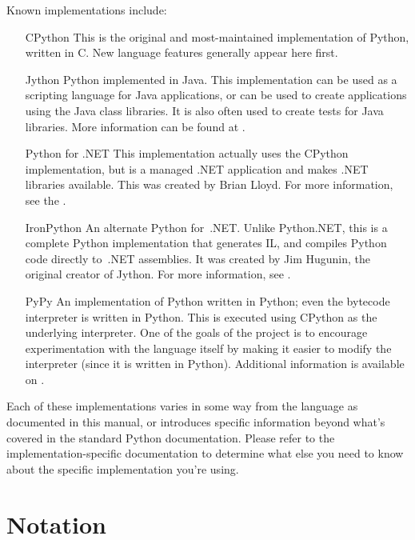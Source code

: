 Known implementations include:

\begin{itemize}
\item[CPython]
This is the original and most-maintained implementation of Python,
written in C.  New language features generally appear here first.

\item[Jython]
Python implemented in Java.  This implementation can be used as a
scripting language for Java applications, or can be used to create
applications using the Java class libraries.  It is also often used to
create tests for Java libraries.  More information can be found at
.

\item[Python for .NET]
This implementation actually uses the CPython implementation, but is a
managed .NET application and makes .NET libraries available.  This was
created by Brian Lloyd.  For more information, see the .

\item[IronPython]
An alternate Python for\ .NET.  Unlike Python.NET, this is a complete
Python implementation that generates IL, and compiles Python code
directly to\ .NET assemblies.  It was created by Jim Hugunin, the
original creator of Jython.  For more information, see .

\item[PyPy]
An implementation of Python written in Python; even the bytecode
interpreter is written in Python.  This is executed using CPython as
the underlying interpreter.  One of the goals of the project is to
encourage experimentation with the language itself by making it easier
to modify the interpreter (since it is written in Python).  Additional
information is available on .
\end{itemize}

Each of these implementations varies in some way from the language as
documented in this manual, or introduces specific information beyond
what's covered in the standard Python documentation.  Please refer to
the implementation-specific documentation to determine what else you
need to know about the specific implementation you're using.


\section{Notation\label{notation}}

